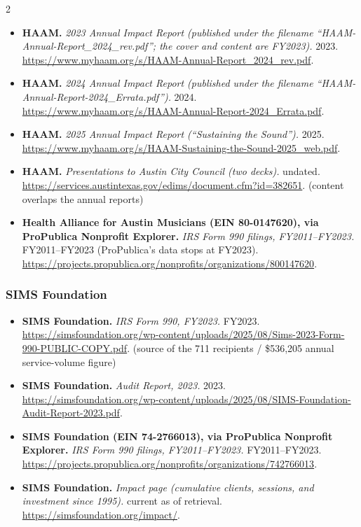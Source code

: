 {\begin{multicols}{2}
\begin{itemize}[itemsep=0pt,topsep=1pt,parsep=0pt,partopsep=0pt,leftmargin=1em]
\item \textbf{HAAM.} \textit{2023 Annual Impact Report (published under the filename “HAAM-Annual-Report\_2024\_rev.pdf”; the cover and content are FY2023).} 2023. \url{https://www.myhaam.org/s/HAAM-Annual-Report_2024_rev.pdf}.
\item \textbf{HAAM.} \textit{2024 Annual Impact Report (published under the filename “HAAM-Annual-Report-2024\_Errata.pdf”).} 2024. \url{https://www.myhaam.org/s/HAAM-Annual-Report-2024_Errata.pdf}.
\item \textbf{HAAM.} \textit{2025 Annual Impact Report (“Sustaining the Sound”).} 2025. \url{https://www.myhaam.org/s/HAAM-Sustaining-the-Sound-2025_web.pdf}.
\item \textbf{HAAM.} \textit{Presentations to Austin City Council (two decks).} undated. \url{https://services.austintexas.gov/edims/document.cfm?id=382651}. {\color{ammuted}(content overlaps the annual reports)}
\item \textbf{Health Alliance for Austin Musicians (EIN 80-0147620), via ProPublica Nonprofit Explorer.} \textit{IRS Form 990 filings, FY2011--FY2023.} FY2011--FY2023 (ProPublica’s data stops at FY2023). \url{https://projects.propublica.org/nonprofits/organizations/800147620}.
\end{itemize}
\subsubsection*{SIMS Foundation}
\begin{itemize}[itemsep=0pt,topsep=1pt,parsep=0pt,partopsep=0pt,leftmargin=1em]
\item \textbf{SIMS Foundation.} \textit{IRS Form 990, FY2023.} FY2023. \url{https://simsfoundation.org/wp-content/uploads/2025/08/Sims-2023-Form-990-PUBLIC-COPY.pdf}. {\color{ammuted}(source of the 711 recipients / \$536,205 annual service-volume figure)}
\item \textbf{SIMS Foundation.} \textit{Audit Report, 2023.} 2023. \url{https://simsfoundation.org/wp-content/uploads/2025/08/SIMS-Foundation-Audit-Report-2023.pdf}.
\item \textbf{SIMS Foundation (EIN 74-2766013), via ProPublica Nonprofit Explorer.} \textit{IRS Form 990 filings, FY2011--FY2023.} FY2011--FY2023. \url{https://projects.propublica.org/nonprofits/organizations/742766013}.
\item \textbf{SIMS Foundation.} \textit{Impact page (cumulative clients, sessions, and investment since 1995).} current as of retrieval. \url{https://simsfoundation.org/impact/}.
\end{itemize}

\end{multicols}}
